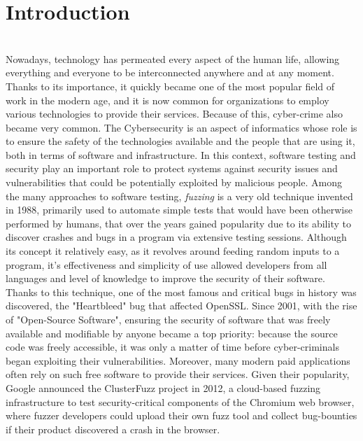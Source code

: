 \chapter{Introduction}
\ \\
Nowadays, technology has permeated every aspect of the human life, allowing everything and everyone to be interconnected anywhere and at any moment. Thanks to its importance, it quickly became one of the most popular field of work in the modern age, and it is now common for organizations to employ various technologies to provide their services. Because of this, cyber-crime also became very common.
\newline
The Cybersecurity is an aspect of informatics whose role is to ensure the safety of the technologies available and the people that are using it, both in terms of software and infrastructure. In this context, software testing and security play an important role to protect systems against security issues and vulnerabilities that could be potentially exploited by malicious people.
\newline \newline
Among the many approaches to software testing, \textit{fuzzing} is a very old technique invented in 1988, primarily used to automate simple tests that would have been otherwise performed by humans, that over the years gained popularity due to its ability to discover crashes and bugs in a program via extensive testing sessions. Although its concept it relatively easy, as it revolves around feeding random inputs to a program, it's effectiveness and simplicity of use allowed developers from all languages and level of knowledge to improve the security of their software.
\newline
Thanks to this technique, one of the most famous and critical bugs in history was discovered, the "Heartbleed" bug that affected OpenSSL.
\newline \newline
Since 2001, with the rise of "Open-Source Software", ensuring the security of software that was freely available and modifiable by anyone became a top priority: because the source code was freely accessible, it was only a matter of time before cyber-criminals began exploiting their vulnerabilities. Moreover, many modern paid applications often rely on such free software to provide their services. 
\newline
Given their popularity, Google announced the ClusterFuzz project in 2012, a cloud-based fuzzing infrastructure to test security-critical components of the Chromium web browser, where fuzzer developers could upload their own fuzz tool and collect bug-bounties if their product discovered a crash in the browser.
